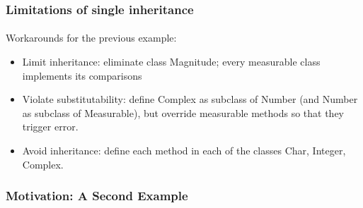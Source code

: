 \documentclass[handout]{beamer}
\begin{document}
\begin{frame}[fragile]
\frametitle{Limitations of single inheritance}
\framesubtitle{}
Workarounds for the previous example:

\begin{itemize}
\item Limit inheritance: eliminate class Magnitude; every measurable
class implements its comparisons
\item Violate substitutability: define Complex as subclass of Number
(and Number as subclass of Measurable), but override measurable
methods so that they trigger error.
\item Avoid inheritance: define each method in each of the classes
Char, Integer, Complex.
\end{itemize}
\end{frame}

\begin{frame}[fragile]
\frametitle{Motivation: A Second Example}
\framesubtitle{}
\begin{overlayarea}{\textwidth}{\textheight}\centering
{}
\end{overlayarea}
\vfill
\end{frame}
\end{document}
